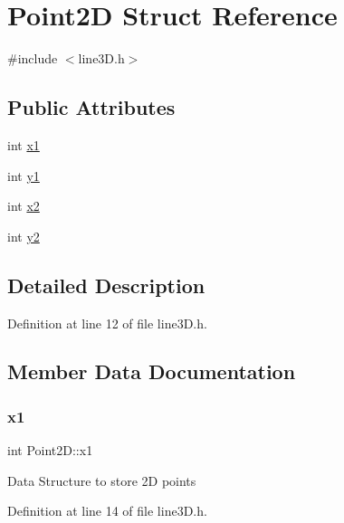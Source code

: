 \hypertarget{struct_point2_d}{}\section{Point2D Struct Reference}
\label{struct_point2_d}


{\ttfamily \#include $<$line3\+D.\+h$>$}

\subsection*{Public Attributes}
\begin{DoxyCompactItemize}
\item 
int \mbox{\hyperlink{struct_point2_d_ab816b51bb0491cec782992f2d7c7f6f8}{x1}}
\item 
int \mbox{\hyperlink{struct_point2_d_ac09354a3ad6dff717cf382c7db2d185f}{y1}}
\item 
int \mbox{\hyperlink{struct_point2_d_a3a7209e6cc4ae1dc3ae64b820de40033}{x2}}
\item 
int \mbox{\hyperlink{struct_point2_d_aad6ee2882c6ac4b12b924b940a9cd015}{y2}}
\end{DoxyCompactItemize}


\subsection{Detailed Description}


Definition at line 12 of file line3\+D.\+h.



\subsection{Member Data Documentation}
\mbox{\label{struct_point2_d_ab816b51bb0491cec782992f2d7c7f6f8}} 
\subsubsection{\texorpdfstring{x1}{x1}}
{\footnotesize\ttfamily int Point2\+D\+::x1}

Data Structure to store 2D points 

Definition at line 14 of file line3\+D.\+h.

\mbox{\label{struct_point2_d_a3a7209e6cc4ae1dc3ae64b820de40033}} 
